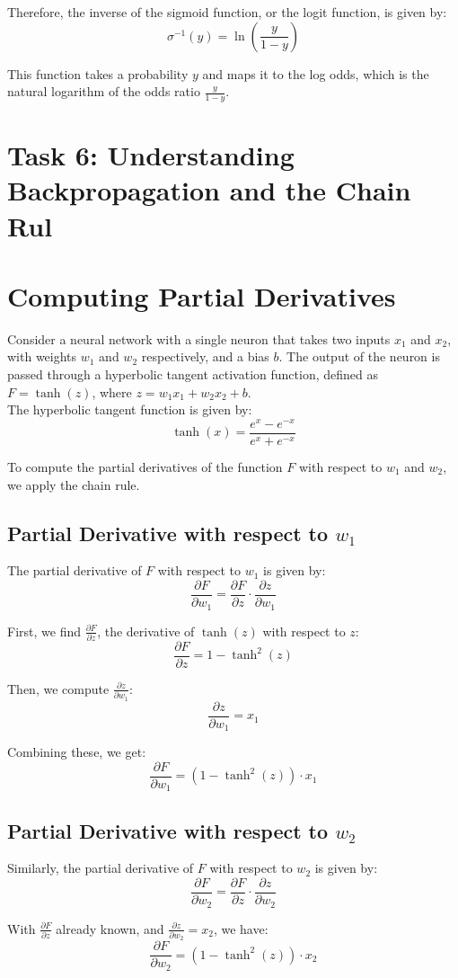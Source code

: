 \documentclass[10pt]{article}
\begin{document}
Therefore, the inverse of the sigmoid function, or the logit function, is given by:
\[ \sigma^{-1}(y) = \ln\left(\frac{y}{1 - y}\right) \]

This function takes a probability \( y \) and maps it to the log odds, which is the natural logarithm of the odds ratio \( \frac{y}{1 - y} \).

\section*{\textbf{Task 6}: Understanding Backpropagation and the Chain Rul}

\section*{Computing Partial Derivatives}
Consider a neural network with a single neuron that takes two inputs \( x_1 \) and \( x_2 \), with weights \( w_1 \) and \( w_2 \) respectively, and a bias \( b \). The output of the neuron is passed through a hyperbolic tangent activation function, defined as \( F = \tanh(z) \), where \( z = w_1x_1 + w_2x_2 + b \).\\

The hyperbolic tangent function is given by:
\[ \tanh(x) = \frac{e^x - e^{-x}}{e^x + e^{-x}} \]

To compute the partial derivatives of the function \( F \) with respect to \( w_1 \) and \( w_2 \), we apply the chain rule.

\subsection*{Partial Derivative with respect to \( w_1 \)}
The partial derivative of \( F \) with respect to \( w_1 \) is given by:
\[ \frac{\partial F}{\partial w_1} = \frac{\partial F}{\partial z} \cdot \frac{\partial z}{\partial w_1} \]

First, we find \( \frac{\partial F}{\partial z} \), the derivative of \( \tanh(z) \) with respect to \( z \):
\[ \frac{\partial F}{\partial z} = 1 - \tanh^2(z) \]

Then, we compute \( \frac{\partial z}{\partial w_1} \):
\[ \frac{\partial z}{\partial w_1} = x_1 \]

Combining these, we get:
\[ \frac{\partial F}{\partial w_1} = (1 - \tanh^2(z)) \cdot x_1 \]

\subsection*{Partial Derivative with respect to \( w_2 \)}
Similarly, the partial derivative of \( F \) with respect to \( w_2 \) is given by:
\[ \frac{\partial F}{\partial w_2} = \frac{\partial F}{\partial z} \cdot \frac{\partial z}{\partial w_2} \]

With \( \frac{\partial F}{\partial z} \) already known, and \( \frac{\partial z}{\partial w_2} = x_2 \), we have:
\[ \frac{\partial F}{\partial w_2} = (1 - \tanh^2(z)) \cdot x_2 \]
\end{document}
